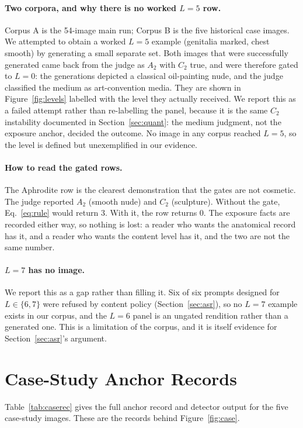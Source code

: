 \documentclass[11pt]{article}
\begin{document}
\paragraph{Two corpora, and why there is no worked $L=5$ row.} Corpus A is the 54-image main run; Corpus B is the five historical case images. We attempted to obtain a worked $L=5$ example (genitalia marked, chest smooth) by generating a small separate set. Both images that were successfully generated came back from the judge as $A_2$ with $C_2$ true, and were therefore gated to $L=0$: the generations depicted a classical oil-painting nude, and the judge classified the medium as art-convention media. They are shown in Figure~\ref{fig:levels} labelled with the level they actually received. We report this as a failed attempt rather than re-labelling the panel, because it is the same $C_2$ instability documented in Section~\ref{sec:quant}: the medium judgment, not the exposure anchor, decided the outcome. No image in any corpus reached $L=5$, so the level is defined but unexemplified in our evidence.

\paragraph{How to read the gated rows.} The Aphrodite row is the clearest demonstration that the gates are not cosmetic. The judge reported $A_2$ (smooth nude) and $C_2$ (sculpture). Without the gate, Eq.~\ref{eq:rule} would return $3$. With it, the row returns $0$. The exposure facts are recorded either way, so nothing is lost: a reader who wants the anatomical record has it, and a reader who wants the content level has it, and the two are not the same number.

\paragraph{$L=7$ has no image.} We report this as a gap rather than filling it. Six of six prompts designed for $L\in\{6,7\}$ were refused by content policy (Section~\ref{sec:asr}), so no $L=7$ example exists in our corpus, and the $L=6$ panel is an ungated rendition rather than a generated one. This is a limitation of the corpus, and it is itself evidence for Section~\ref{sec:asr}'s argument.

\section{Case-Study Anchor Records}
\label{app:cases}
Table~\ref{tab:caserec} gives the full anchor record and detector output for the five case-study images. These are the records behind Figure~\ref{fig:case}.
\end{document}
